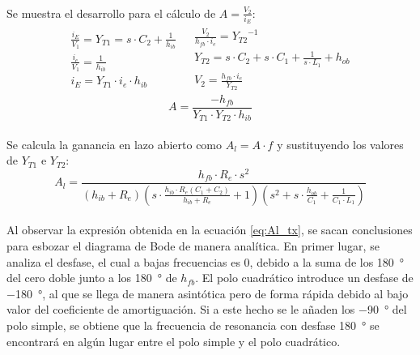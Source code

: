\paragraph{}
Se muestra el desarrollo para el c\'alculo de $A = \frac{V_2}{i_E}$:
\[
\begin{array}{rl} 
      \begin{array}{l}
   \frac{i_E}{V_1} = Y_{T1} = s\cdot C_2 + \frac{1}{h_{ib}} \\
   \frac{i_e}{V_{1}} = \frac{1}{h_{ib}} \\
   i_E = Y_{T1} \cdot i_e \cdot h_{ib}
      \end{array}
      &
      \begin{array}{r}
   \frac{V_2}{h_{fb}\cdot i_e} = {Y_{T2}}^{-1} \\
   Y_{T2} = s\cdot C_2 + s\cdot C_1 + \frac{1}{s\cdot L_1} + h_{ob} \\
   V_2 = \frac{h_{fb}\cdot i_e}{Y_{T2}} 
      \end{array}
\end{array}
\]
\begin{equation}
   A = \frac{-h_{fb}}{Y_{T1} \cdot Y_{T2} \cdot h_{ib}} 
\end{equation}
\paragraph{}
Se calcula la ganancia en lazo abierto como $A_l = A \cdot f$ y sustituyendo los valores de $Y_{T1}$ e $Y_{T2}$:
\begin{equation}
   \label{eq:Al_tx}
   A_l = \frac{h_{fb} \cdot R_e \cdot s^2}{ \left( h_{ib}+R_e \right) \left( s \cdot \frac{ h_{ib} \cdot R_e (C_1+C_2)}{h_{ib}+R_e} + 1\right) \left( s^2 + s \cdot \frac{h_{ob}}{C_1} + \frac{1}{C_1 \cdot L_1}\right) }
\end{equation}
\paragraph{}
Al observar la expresi\'on obtenida en la ecuaci\'on \ref{eq:Al_tx}, se sacan conclusiones para esbozar el diagrama de Bode de manera anal\'itica. En primer lugar, se analiza el desfase, el cual a bajas frecuencias es 0, debido a la suma de los \SI{180}{\degree} del cero doble junto a los \SI{180}{\degree} de $h_{fb}$. El polo cuadr\'atico introduce un desfase de \SI{-180}{\degree}, al que se llega de manera asint\'otica pero de forma r\'apida debido al bajo valor del coeficiente de amortiguaci\'on. Si a este hecho se le añaden los \SI{-90}{\degree} del polo simple, se obtiene que la frecuencia de resonancia con desfase \SI{180}{\degree} se encontrará en algún lugar entre el polo simple y el polo cuadrático.

